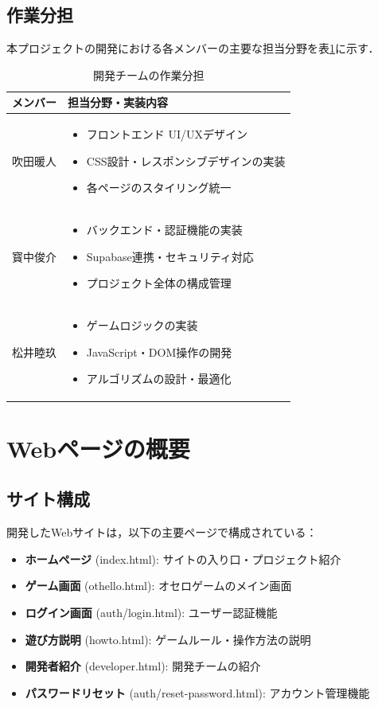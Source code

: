 \documentclass[10pt, a4paper]{jsarticle}
\begin{document}
\subsection{作業分担}
本プロジェクトの開発における各メンバーの主要な担当分野を表\ref{tab:work_division}に示す．

\begin{table}[H]
\centering
\caption{開発チームの作業分担}
\label{tab:work_division}
\begin{tabular}{|l|p{8cm}|}
\hline
\textbf{メンバー} & \textbf{担当分野・実装内容} \\
\hline
吹田暖人 & 
\begin{itemize}
\item フロントエンド UI/UXデザイン
\item CSS設計・レスポンシブデザインの実装
\item 各ページのスタイリング統一
\end{itemize} \\
\hline
寳中俊介 & 
\begin{itemize}
\item バックエンド・認証機能の実装
\item Supabase連携・セキュリティ対応
\item プロジェクト全体の構成管理
\end{itemize} \\
\hline
松井睦玖 & 
\begin{itemize}
\item ゲームロジックの実装
\item JavaScript・DOM操作の開発
\item アルゴリズムの設計・最適化
\end{itemize} \\
\hline
\end{tabular}
\end{table}

\section{Webページの概要}\label{sec:web_overview}

\subsection{サイト構成}
開発したWebサイトは，以下の主要ページで構成されている：

\begin{itemize}
    \item \textbf{ホームページ} (index.html): サイトの入り口・プロジェクト紹介
    \item \textbf{ゲーム画面} (othello.html): オセロゲームのメイン画面
    \item \textbf{ログイン画面} (auth/login.html): ユーザー認証機能
    \item \textbf{遊び方説明} (howto.html): ゲームルール・操作方法の説明
    \item \textbf{開発者紹介} (developer.html): 開発チームの紹介
    \item \textbf{パスワードリセット} (auth/reset-password.html): アカウント管理機能
\end{itemize}
\end{document}
